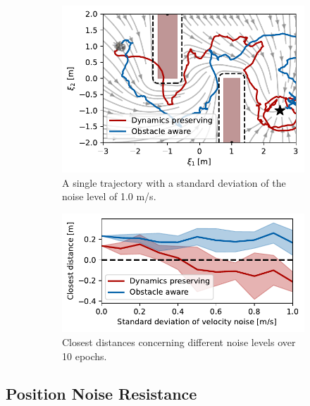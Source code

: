 \begin{figure}
    \centering
    \begin{subfigure}{\columnwidth}
      \centerline{\includegraphics[width=\textwidth]{figures/trajectory_velocity_noise}}
      \caption{A single trajectory with a standard deviation of the noise level of 1.0 m/s.}
      \label{fig:trajectory_velocity_noise}
    \end{subfigure}
    \begin{subfigure}{\columnwidth}
    \includegraphics[width=\textwidth]{figures/comparison_velocity_noise}
      \caption{Closest distances concerning different noise levels over 10 epochs.}
      \label{fig:comparison_velocity_noise}
    \end{subfigure}
    \caption{}
\label{fig:velocity_noise}
\end{figure}


\subsection{Position Noise Resistance}

